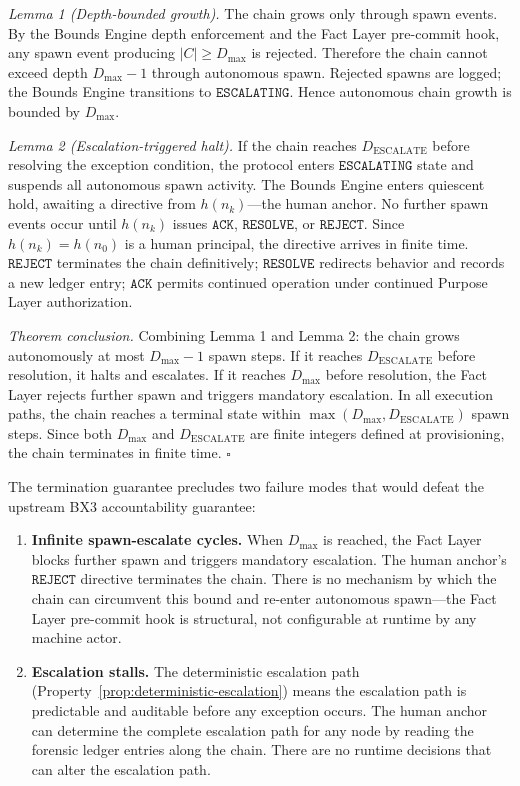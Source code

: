 \medskip
\textit{Lemma 1 (Depth-bounded growth).} The chain grows only through spawn events. By the Bounds Engine depth enforcement and the Fact Layer pre-commit hook, any spawn event producing $|C| \geq D_{\mathrm{max}}$ is rejected. Therefore the chain cannot exceed depth $D_{\mathrm{max}} - 1$ through autonomous spawn. Rejected spawns are logged; the Bounds Engine transitions to $\texttt{ESCALATING}$. Hence autonomous chain growth is bounded by $D_{\mathrm{max}}$.

\medskip
\textit{Lemma 2 (Escalation-triggered halt).} If the chain reaches $D_{\mathrm{ESCALATE}}$ before resolving the exception condition, the protocol enters $\texttt{ESCALATING}$ state and suspends all autonomous spawn activity. The Bounds Engine enters quiescent hold, awaiting a directive from $h(n_k)$---the human anchor. No further spawn events occur until $h(n_k)$ issues $\texttt{ACK}$, $\texttt{RESOLVE}$, or $\texttt{REJECT}$. Since $h(n_k) = h(n_0)$ is a human principal, the directive arrives in finite time. $\texttt{REJECT}$ terminates the chain definitively; $\texttt{RESOLVE}$ redirects behavior and records a new ledger entry; $\texttt{ACK}$ permits continued operation under continued Purpose Layer authorization.

\medskip
\textit{Theorem conclusion.} Combining Lemma 1 and Lemma 2: the chain grows autonomously at most $D_{\mathrm{max}} - 1$ spawn steps. If it reaches $D_{\mathrm{ESCALATE}}$ before resolution, it halts and escalates. If it reaches $D_{\mathrm{max}}$ before resolution, the Fact Layer rejects further spawn and triggers mandatory escalation. In all execution paths, the chain reaches a terminal state within $\max(D_{\mathrm{max}}, D_{\mathrm{ESCALATE}})$ spawn steps. Since both $D_{\mathrm{max}}$ and $D_{\mathrm{ESCALATE}}$ are finite integers defined at provisioning, the chain terminates in finite time. $\square$

\medskip
The termination guarantee precludes two failure modes that would defeat the upstream BX3 accountability guarantee:

\begin{enumerate}
    \item[(T1)] \textbf{Infinite spawn-escalate cycles.} When $D_{\mathrm{max}}$ is reached, the Fact Layer blocks further spawn and triggers mandatory escalation. The human anchor's $\texttt{REJECT}$ directive terminates the chain. There is no mechanism by which the chain can circumvent this bound and re-enter autonomous spawn---the Fact Layer pre-commit hook is structural, not configurable at runtime by any machine actor.
    \item[(T2)] \textbf{Escalation stalls.} The deterministic escalation path (Property~\ref{prop:deterministic-escalation}) means the escalation path is predictable and auditable before any exception occurs. The human anchor can determine the complete escalation path for any node by reading the forensic ledger entries along the chain. There are no runtime decisions that can alter the escalation path.
\end{enumerate}

